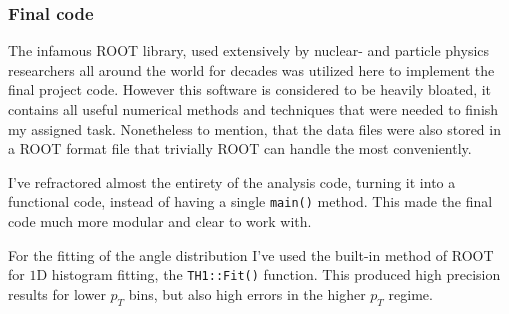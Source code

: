 \subsubsection{Final code}
The infamous ROOT library, used extensively by nuclear- and particle physics researchers all around the world for decades was utilized here to implement the final project code. However this software is considered to be heavily bloated, it contains all useful numerical methods and techniques that were needed to finish my assigned task. Nonetheless to mention, that the data files were also stored in a ROOT format file that trivially ROOT can handle the most conveniently.

I've refractored almost the entirety of the analysis code, turning it into a functional code, instead of having a single \texttt{main()} method. This made the final code much more modular and clear to work with.

For the fitting of the angle distribution I've used the built-in method of ROOT for $1$D histogram fitting, the \texttt{TH1::Fit()} function. This produced high precision results for lower $p_{T}$ bins, but also high errors in the higher $p_{T}$ regime.